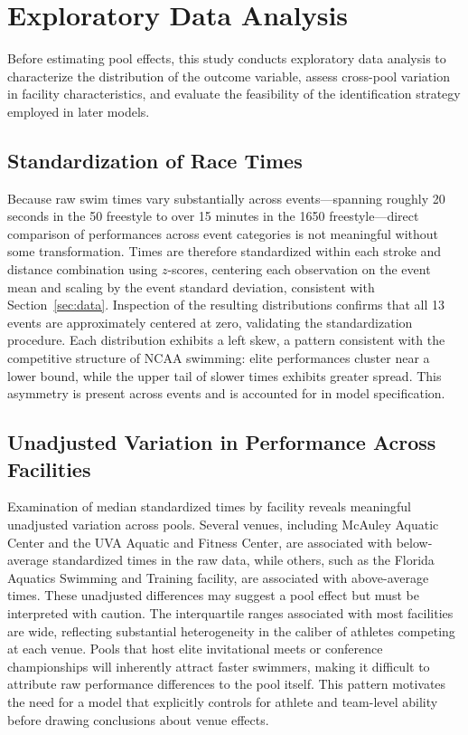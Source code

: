 \documentclass[12pt]{article}
\begin{document}
\section{Exploratory Data Analysis}

Before estimating pool effects, this study conducts exploratory data analysis
to characterize the distribution of the outcome variable, assess cross-pool
variation in facility characteristics, and evaluate the feasibility of the
identification strategy employed in later models.

\subsection{Standardization of Race Times}

Because raw swim times vary substantially across events---spanning roughly 20
seconds in the 50 freestyle to over 15 minutes in the 1650 freestyle---direct
comparison of performances across event categories is not meaningful without
some transformation. Times are therefore standardized within each stroke and
distance combination using $z$-scores, centering each observation on the event
mean and scaling by the event standard deviation, consistent with
Section~\ref{sec:data}. Inspection of the resulting distributions confirms that
all 13 events are approximately centered at zero, validating the standardization
procedure. Each distribution exhibits a left skew, a pattern consistent with
the competitive structure of NCAA swimming: elite performances cluster near a
lower bound, while the upper tail of slower times exhibits greater spread. This
asymmetry is present across events and is accounted for in model specification.

\subsection{Unadjusted Variation in Performance Across Facilities}

Examination of median standardized times by facility reveals meaningful
unadjusted variation across pools. Several venues, including McAuley Aquatic
Center and the UVA Aquatic and Fitness Center, are associated with below-average
standardized times in the raw data, while others, such as the Florida Aquatics
Swimming and Training facility, are associated with above-average times. These
unadjusted differences may suggest a pool effect but must be interpreted with
caution. The interquartile ranges associated with most facilities are wide,
reflecting substantial heterogeneity in the caliber of athletes competing at
each venue. Pools that host elite invitational meets or conference championships
will inherently attract faster swimmers, making it difficult to attribute raw
performance differences to the pool itself. This pattern motivates the need for
a model that explicitly controls for athlete and team-level ability before
drawing conclusions about venue effects.
\end{document}
